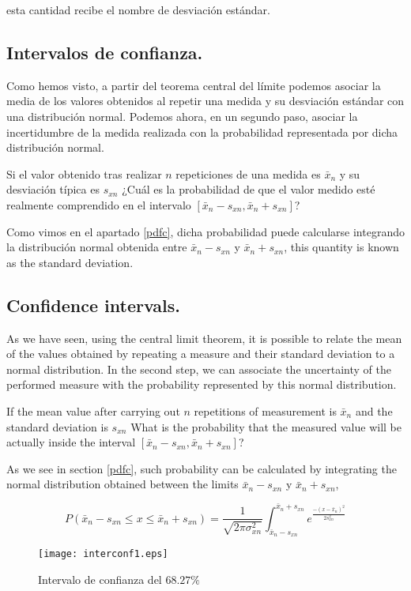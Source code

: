 \begin{paracol}{2}
esta cantidad recibe el nombre de desviación estándar.

\subsection{Intervalos de confianza.}
Como hemos visto, a partir del teorema central del límite podemos asociar la media de los valores obtenidos al repetir una medida y su desviación estándar con una distribución normal. Podemos ahora, en un segundo paso, asociar la incertidumbre de la medida realizada con la probabilidad representada por dicha distribución normal.

Si el valor obtenido tras realizar $n$ repeticiones de una medida es $\bar{x}_n$ y su desviación típica es $s_{xn}$ ¿Cuál es la probabilidad de que el valor medido esté realmente comprendido en el intervalo $[\bar{x}_n-s_{xn}, \bar{x}_n+s_{xn}]$? 

Como vimos en el apartado \ref{pdfc}, dicha probabilidad puede calcularse integrando la distribución normal obtenida entre $\bar{x}_n-s_{xn}$ y $\bar{x}_n+s_{xn}$,
\switchcolumn
this quantity is known as the standard deviation.

\subsection{Confidence intervals.}
As we have seen, using the central limit theorem, it is possible to relate the mean of the values obtained by repeating a measure and their standard deviation to a normal distribution. In the second step, we can associate the uncertainty of the performed measure with the probability represented by this normal distribution.

If the mean value after carrying out $n$ repetitions of measurement is $\bar{x}_n$ and the standard deviation is $s_{xn}$ What is the probability that the measured value will be actually inside the interval $[\bar{x}_n-s_{xn}, \bar{x}_n+s_{xn}]$? 

As we see in section \ref{pdfc}, such probability can be calculated by integrating the normal distribution obtained between the limits $\bar{x}_n-s_{xn}$ y $\bar{x}_n+s_{xn}$,
\end{paracol}

\begin{equation*}
P(\bar{x}_n - s_{xn} \leqslant x \leqslant \bar{x}_n
+ s_{xn}) = \frac{1}{\sqrt{2\pi\sigma^2_{xn}}}\int_{\bar{x}_n-s_{xn}}^{\bar{x}_n+s_{xn}}e^{\frac{-(x-\bar{x}_n)^2}{2s_{xn}^2}}
\end{equation*}
\begin{figure}[h]
\centering
\texttt{[image: interconf1.eps]}
\caption{Intervalo de confianza del $68.27\%$ }
\label{fig:ic1}
\end{figure}

